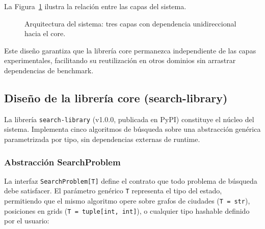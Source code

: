 La Figura~\ref{fig:system_arch} ilustra la relación entre las capas del sistema.

\begin{figure}[H]
\centering
{}
\caption{Arquitectura del sistema: tres capas con dependencia unidireccional hacia el core.}
\label{fig:system_arch}
\end{figure}

Este diseño garantiza que la librería core permanezca independiente de las capas experimentales, facilitando su reutilización en otros dominios sin arrastrar dependencias de benchmark.

\subsection{Diseño de la librería core (search-library)}

La librería \texttt{search-library} (v1.0.0, publicada en PyPI) constituye el núcleo del sistema. Implementa cinco algoritmos de búsqueda sobre una abstracción genérica parametrizada por tipo, sin dependencias externas de runtime.

\subsubsection{Abstracción SearchProblem}

La interfaz \texttt{SearchProblem[T]} define el contrato que todo problema de búsqueda debe satisfacer. El parámetro genérico \texttt{T} representa el tipo del estado, permitiendo que el mismo algoritmo opere sobre grafos de ciudades (\texttt{T = str}), posiciones en grids (\texttt{T = tuple[int, int]}), o cualquier tipo hashable definido por el usuario:


